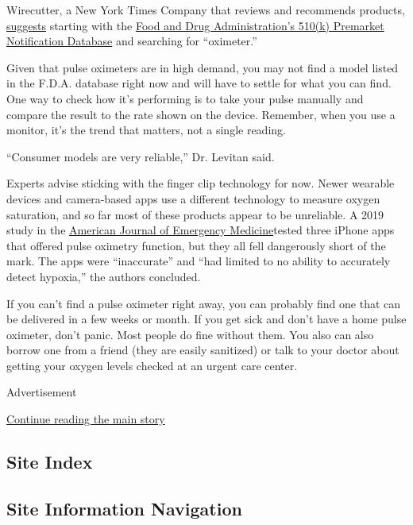 Wirecutter, a New York Times Company that reviews and recommends
products,
\href{https://thewirecutter.com/blog/coronavirus-pulse-oximeter/}{suggests}
starting with the
\href{https://www.accessdata.fda.gov/scripts/cdrh/cfdocs/cfpmn/pmn.cfm}{Food
and Drug Administration's 510(k) Premarket Notification Database} and
searching for ``oximeter.''

Given that pulse oximeters are in high demand, you may not find a model
listed in the F.D.A. database right now and will have to settle for what
you can find. One way to check how it's performing is to take your pulse
manually and compare the result to the rate shown on the device.
Remember, when you use a monitor, it's the trend that matters, not a
single reading.

``Consumer models are very reliable,'' Dr. Levitan said.

Experts advise sticking with the finger clip technology for now. Newer
wearable devices and camera-based apps use a different technology to
measure oxygen saturation, and so far most of these products appear to
be unreliable. A 2019 study in the
\href{https://www.ncbi.nlm.nih.gov/pubmed/31471076}{American Journal of
Emergency Medicine}tested three iPhone apps that offered pulse oximetry
function, but they all fell dangerously short of the mark. The apps were
``inaccurate'' and ``had limited to no ability to accurately detect
hypoxia,'' the authors concluded.

If you can't find a pulse oximeter right away, you can probably find one
that can be delivered in a few weeks or month. If you get sick and don't
have a home pulse oximeter, don't panic. Most people do fine without
them. You also can also borrow one from a friend (they are easily
sanitized) or talk to your doctor about getting your oxygen levels
checked at an urgent care center.

Advertisement

\protect\hyperlink{after-bottom}{Continue reading the main story}

\hypertarget{site-index}{%
\subsection{Site Index}\label{site-index}}

\hypertarget{site-information-navigation}{%
\subsection{Site Information
Navigation}\label{site-information-navigation}}

